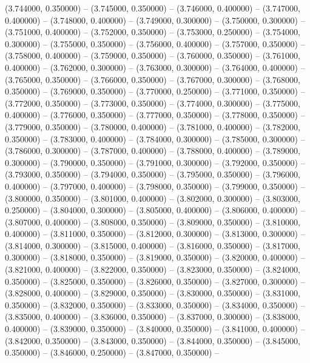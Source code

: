 (3.744000, 0.350000) -- 
(3.745000, 0.350000) -- 
(3.746000, 0.400000) -- 
(3.747000, 0.400000) -- 
(3.748000, 0.400000) -- 
(3.749000, 0.300000) -- 
(3.750000, 0.300000) -- 
(3.751000, 0.400000) -- 
(3.752000, 0.350000) -- 
(3.753000, 0.250000) -- 
(3.754000, 0.300000) -- 
(3.755000, 0.350000) -- 
(3.756000, 0.400000) -- 
(3.757000, 0.350000) -- 
(3.758000, 0.400000) -- 
(3.759000, 0.350000) -- 
(3.760000, 0.350000) -- 
(3.761000, 0.400000) -- 
(3.762000, 0.300000) -- 
(3.763000, 0.300000) -- 
(3.764000, 0.400000) -- 
(3.765000, 0.350000) -- 
(3.766000, 0.350000) -- 
(3.767000, 0.300000) -- 
(3.768000, 0.350000) -- 
(3.769000, 0.350000) -- 
(3.770000, 0.250000) -- 
(3.771000, 0.350000) -- 
(3.772000, 0.350000) -- 
(3.773000, 0.350000) -- 
(3.774000, 0.300000) -- 
(3.775000, 0.400000) -- 
(3.776000, 0.350000) -- 
(3.777000, 0.350000) -- 
(3.778000, 0.350000) -- 
(3.779000, 0.350000) -- 
(3.780000, 0.400000) -- 
(3.781000, 0.400000) -- 
(3.782000, 0.350000) -- 
(3.783000, 0.400000) -- 
(3.784000, 0.300000) -- 
(3.785000, 0.300000) -- 
(3.786000, 0.300000) -- 
(3.787000, 0.400000) -- 
(3.788000, 0.400000) -- 
(3.789000, 0.300000) -- 
(3.790000, 0.350000) -- 
(3.791000, 0.300000) -- 
(3.792000, 0.350000) -- 
(3.793000, 0.350000) -- 
(3.794000, 0.350000) -- 
(3.795000, 0.350000) -- 
(3.796000, 0.400000) -- 
(3.797000, 0.400000) -- 
(3.798000, 0.350000) -- 
(3.799000, 0.350000) -- 
(3.800000, 0.350000) -- 
(3.801000, 0.400000) -- 
(3.802000, 0.300000) -- 
(3.803000, 0.250000) -- 
(3.804000, 0.300000) -- 
(3.805000, 0.400000) -- 
(3.806000, 0.400000) -- 
(3.807000, 0.400000) -- 
(3.808000, 0.350000) -- 
(3.809000, 0.350000) -- 
(3.810000, 0.400000) -- 
(3.811000, 0.350000) -- 
(3.812000, 0.300000) -- 
(3.813000, 0.300000) -- 
(3.814000, 0.300000) -- 
(3.815000, 0.400000) -- 
(3.816000, 0.350000) -- 
(3.817000, 0.300000) -- 
(3.818000, 0.350000) -- 
(3.819000, 0.350000) -- 
(3.820000, 0.400000) -- 
(3.821000, 0.400000) -- 
(3.822000, 0.350000) -- 
(3.823000, 0.350000) -- 
(3.824000, 0.350000) -- 
(3.825000, 0.350000) -- 
(3.826000, 0.350000) -- 
(3.827000, 0.300000) -- 
(3.828000, 0.400000) -- 
(3.829000, 0.350000) -- 
(3.830000, 0.350000) -- 
(3.831000, 0.350000) -- 
(3.832000, 0.350000) -- 
(3.833000, 0.350000) -- 
(3.834000, 0.350000) -- 
(3.835000, 0.400000) -- 
(3.836000, 0.350000) -- 
(3.837000, 0.300000) -- 
(3.838000, 0.400000) -- 
(3.839000, 0.350000) -- 
(3.840000, 0.350000) -- 
(3.841000, 0.400000) -- 
(3.842000, 0.350000) -- 
(3.843000, 0.350000) -- 
(3.844000, 0.350000) -- 
(3.845000, 0.350000) -- 
(3.846000, 0.250000) -- 
(3.847000, 0.350000) -- 
